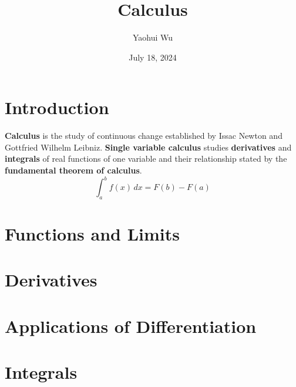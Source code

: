 \documentclass[12pt]{article}
\title{Calculus}
\author{Yaohui Wu}
\date{July 18, 2024}
\begin{document}
\maketitle

\section*{Introduction}
\textbf{Calculus} is the study of continuous change established by Issac
Newton and Gottfried Wilhelm Leibniz.
\textbf{Single variable calculus} studies \textbf{derivatives} and
\textbf{integrals} of real functions of one variable and their relationship
stated by the \textbf{fundamental theorem of calculus}.
\[\int_a^b f(x) \,dx = F(b)-F(a)\]

\tableofcontents

\newpage
\section{Functions and Limits}






\section{Derivatives}






\section{Applications of Differentiation}





\section{Integrals}




\end{document}
